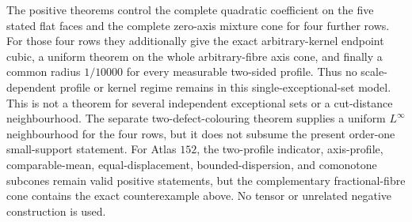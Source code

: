 \documentclass[11pt]{article}
\begin{document}
The positive theorems control the complete quadratic coefficient on the five
stated flat faces and the complete zero-axis mixture cone for four further
rows.  For those four rows they additionally give the exact
arbitrary-kernel endpoint cubic, a uniform theorem on the whole
arbitrary-fibre axis cone, and finally a common radius $1/10000$ for every
measurable two-sided profile.  Thus no scale-dependent profile or kernel
regime remains in this single-exceptional-set model.  This is not a theorem
for several independent exceptional sets or a cut-distance neighbourhood.
The separate two-defect-colouring theorem supplies a uniform $L^\infty$
neighbourhood for the four rows, but it does not subsume the present
order-one small-support statement.  For Atlas $152$, the two-profile indicator,
axis-profile, comparable-mean, equal-displacement, bounded-dispersion, and
comonotone subcones remain valid positive statements, but the complementary
fractional-fibre cone contains the exact counterexample above.  No tensor or
unrelated negative construction is used.
\end{document}
